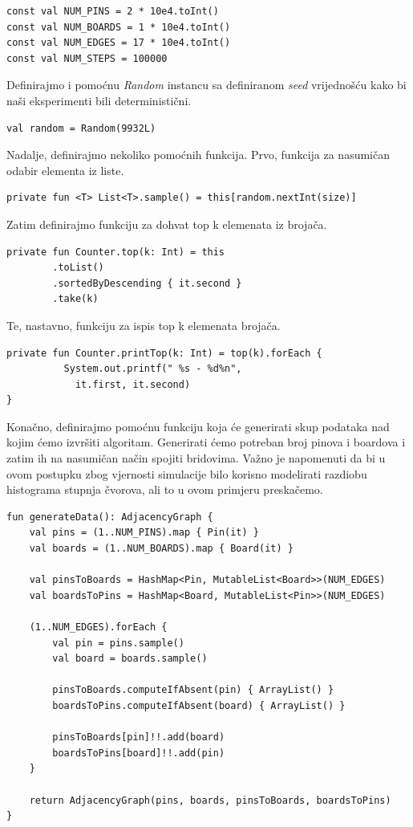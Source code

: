 \documentclass[times, utf8, seminar]{fer}
\begin{document}
\begin{lstlisting}
const val NUM_PINS = 2 * 10e4.toInt()
const val NUM_BOARDS = 1 * 10e4.toInt()
const val NUM_EDGES = 17 * 10e4.toInt()
const val NUM_STEPS = 100000
\end{lstlisting}

Definirajmo i pomoćnu \textit{Random} instancu sa definiranom \textit{seed} vrijednošću kako bi naši eksperimenti bili deterministični.

\begin{lstlisting}
val random = Random(9932L)
\end{lstlisting}

Nadalje, definirajmo nekoliko pomoćnih funkcija. Prvo, funkcija za nasumičan odabir elementa iz liste.

\begin{lstlisting}
private fun <T> List<T>.sample() = this[random.nextInt(size)]
\end{lstlisting}

Zatim definirajmo funkciju za dohvat top k elemenata iz brojača.

\begin{lstlisting}
private fun Counter.top(k: Int) = this
        .toList()
        .sortedByDescending { it.second }
        .take(k)
\end{lstlisting}

Te, nastavno, funkciju za ispis top k elemenata brojača.

\begin{lstlisting}
private fun Counter.printTop(k: Int) = top(k).forEach {
		  System.out.printf(" %s - %d%n",
		  	it.first, it.second)
}
\end{lstlisting}

		  Konačno, definirajmo pomoćnu funkciju koja će generirati skup podataka nad kojim ćemo izvršiti algoritam. Generirati ćemo potreban broj pinova i boardova i zatim ih na nasumičan način spojiti bridovima. Važno je napomenuti da bi u ovom postupku zbog vjernosti simulacije bilo korisno modelirati razdiobu histograma stupnja čvorova, ali to u ovom primjeru preskačemo.

\begin{lstlisting}
fun generateData(): AdjacencyGraph {
    val pins = (1..NUM_PINS).map { Pin(it) }
    val boards = (1..NUM_BOARDS).map { Board(it) }

    val pinsToBoards = HashMap<Pin, MutableList<Board>>(NUM_EDGES)
    val boardsToPins = HashMap<Board, MutableList<Pin>>(NUM_EDGES)

    (1..NUM_EDGES).forEach {
        val pin = pins.sample()
        val board = boards.sample()

        pinsToBoards.computeIfAbsent(pin) { ArrayList() }
        boardsToPins.computeIfAbsent(board) { ArrayList() }

        pinsToBoards[pin]!!.add(board)
        boardsToPins[board]!!.add(pin)
    }

    return AdjacencyGraph(pins, boards, pinsToBoards, boardsToPins)
}
\end{lstlisting}
\end{document}
